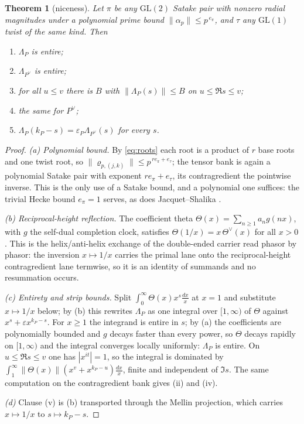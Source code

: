 \documentclass[11pt]{article}
\newtheorem{theorem}{Theorem}
\begin{document}
\begin{theorem}[niceness]\label{thm:nice}
Let $\pi$ be any $\mathrm{GL}(2)$ Satake pair with nonzero radial magnitudes under a polynomial
prime bound $\|\alpha_p\|\le p^{\,e_\pi}$, and $\tau$ any $\mathrm{GL}(1)$ twist of the same kind.
Then
\begin{enumerate}
\item[(i)] $\Lambda_P$ is entire;
\item[(ii)] $\Lambda_{P^\vee}$ is entire;
\item[(iii)] for all $u\le v$ there is $B$ with $\|\Lambda_P(s)\|\le B$ on $u\le\Re s\le v$;
\item[(iv)] the same for $P^\vee$;
\item[(v)] $\Lambda_P(k_P-s)=\varepsilon_P\Lambda_{P^\vee}(s)$ for every $s$.
\end{enumerate}
\end{theorem}
\begin{proof}
\emph{(a) Polynomial bound.} By \eqref{eq:roots} each root is a product of $r$ base roots and one
twist root, so $\|\varrho_{p,(j,k)}\|\le p^{\,re_\pi+e_\tau}$; the tensor bank is again a
polynomial Satake pair with exponent $re_\pi+e_\tau$, its contragredient the pointwise inverse.
This is the only use of a Satake bound, and a polynomial one suffices: the trivial Hecke bound
$e_\pi=1$ serves, as does Jacquet--Shalika \cite{JS}.

\emph{(b) Reciprocal-height reflection.} The coefficient theta $\Theta(x)=\sum_{n\ge1}a_ng(nx)$,
with $g$ the self-dual completion clock, satisfies $\Theta(1/x)=x\,\Theta^{\vee}(x)$ for all
$x>0$. This is the helix/anti-helix exchange of the double-ended carrier read phasor by phasor:
the inversion $x\mapsto1/x$ carries the primal lane onto the reciprocal-height contragredient
lane termwise, so it is an identity of summands and no resummation occurs.

\emph{(c) Entirety and strip bounds.} Split $\int_0^\infty\Theta(x)x^{s}\frac{dx}{x}$ at $x=1$ and
substitute $x\mapsto1/x$ below; by (b) this rewrites $\Lambda_P$ as one integral over
$[1,\infty)$ of $\Theta$ against $x^{s}+\varepsilon x^{k_P-s}$. For $x\ge1$ the integrand is
entire in $s$; by (a) the coefficients are polynomially bounded and $g$ decays faster than every
power, so $\Theta$ decays rapidly on $[1,\infty)$ and the integral converges locally uniformly:
$\Lambda_P$ is entire. On $u\le\Re s\le v$ one has $|x^{it}|=1$, so the integral is dominated by
$\int_1^\infty\|\Theta(x)\|(x^{v}+x^{k_P-u})\frac{dx}{x}$, finite and independent of $\Im s$.
The same computation on the contragredient bank gives (ii) and (iv).

\emph{(d)} Clause (v) is (b) transported through the Mellin projection, which carries
$x\mapsto1/x$ to $s\mapsto k_P-s$.
\end{proof}
\end{document}
